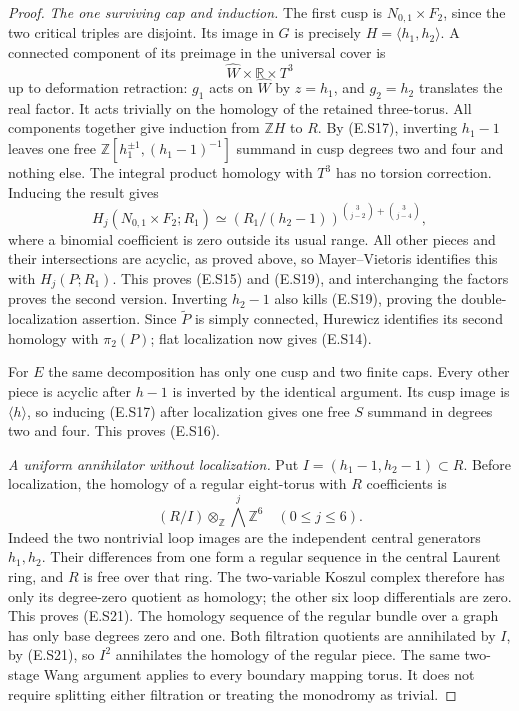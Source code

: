 \begin{proof}
\emph{The one surviving cap and induction.}
The first cusp is $N_{0,1}\times F_2$, since the two critical
triples are disjoint. Its image in $G$ is precisely
$H=\langle h_1,h_2\rangle$. A connected component of its
preimage in the universal cover is
\[
                \widehat W\times\mathbb R\times T^3
\]
up to deformation retraction: $g_1$ acts on $\widehat W$ by
$z=h_1$, and $g_2=h_2$ translates the real factor. It acts
trivially on the homology of the retained three-torus. All
components together give induction from $\mathbb ZH$ to
$R$. By (E.S17), inverting $h_1-1$ leaves one free
$\mathbb Z[h_1^{\pm1},(h_1-1)^{-1}]$ summand in cusp degrees
two and four and nothing else. The integral product homology
with $T^3$ has no torsion correction. Inducing the result gives
\[
 H_j(N_{0,1}\times F_2;R_1)
   \simeq
 \left(R_1/(h_2-1)\right)^{
           \binom3{j-2}+\binom3{j-4}},
 \tag{E.S19}
\]
where a binomial coefficient is zero outside its usual range.
All other pieces and their intersections are acyclic, as
proved above, so Mayer--Vietoris identifies this with
$H_j(P;R_1)$. This proves (E.S15) and (E.S19), and interchanging
the factors proves the second version. Inverting $h_2-1$
also kills (E.S19), proving the double-localization assertion.
Since $\widetilde P$ is simply connected, Hurewicz identifies
its second homology with $\pi_2(P)$; flat localization now
gives (E.S14).

For $E$ the same decomposition has only one cusp and two
finite caps. Every other piece is acyclic after $h-1$ is
inverted by the identical argument. Its cusp image is
$\langle h\rangle$, so inducing (E.S17) after localization
gives one free $S$ summand in degrees two and four. This
proves (E.S16).

\emph{A uniform annihilator without localization.}
Put $I=(h_1-1,h_2-1)\subset R$. Before localization, the homology
of a regular eight-torus with $R$ coefficients is
\[
                 (R/I)\otimes_{\mathbb Z}\bigwedge^j\mathbb Z^6
                      \quad(0\leq j\leq6).
 \tag{E.S21}
\]
Indeed the two nontrivial loop images are the independent central
generators $h_1,h_2$. Their differences from one form a regular
sequence in the central Laurent ring, and $R$ is free over that
ring. The two-variable Koszul complex therefore has only its
degree-zero quotient as homology; the other six loop differentials
are zero. This proves (E.S21).
The homology sequence of the regular bundle over a graph has
only base degrees zero and one. Both filtration quotients are
annihilated by $I$, by (E.S21), so $I^2$ annihilates the homology
of the regular piece. The same two-stage Wang argument applies
to every boundary mapping torus. It does not require splitting
either filtration or treating the monodromy as trivial.


\end{proof}
